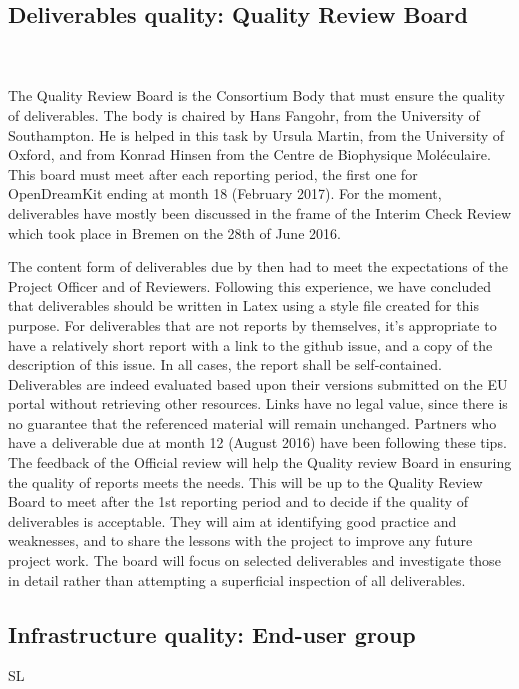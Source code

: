 \documentclass{deliverablereport}
\begin{document}
\subsection{Deliverables quality: Quality Review Board}
 ~\\~\\
The Quality Review Board is the Consortium Body that must ensure the quality of deliverables.
The body is chaired by Hans Fangohr, from the University of Southampton. He is helped in this task by Ursula Martin, from the University of Oxford, and from Konrad Hinsen from the Centre de Biophysique Moléculaire. This board must meet after each reporting period, the first one for OpenDreamKit ending at month 18 (February 2017). 
For the moment, deliverables have mostly been discussed in the frame of the Interim Check Review which took place in Bremen on the 28th of June 2016.


The content form of deliverables due by then had to meet the expectations of the Project Officer and of Reviewers. Following this experience, we have concluded that deliverables should be written in Latex using a style file created for this purpose. For deliverables that are not reports by themselves, it's appropriate to have a relatively short report with a link to the github issue, and a copy of the description of this issue. In all cases, the report shall be self-contained. Deliverables are indeed evaluated based upon their versions submitted on the EU portal without retrieving other resources. Links have no legal value, since there is no guarantee that the referenced material will remain unchanged.
Partners who have a deliverable due at month 12 (August 2016) have been following these tips. The feedback of the Official review will help the Quality review Board in ensuring the quality of reports meets the needs. This will be up to the Quality Review Board to meet after the 1st reporting period and to decide if the quality of deliverables is acceptable.
They will aim at identifying good practice and weaknesses, and to share the lessons with the project to improve any future project work. The board will focus on selected deliverables and investigate those in detail rather than attempting a superficial inspection of all deliverables.


\subsection{Infrastructure quality: End-user group} 

SL
\end{document}
